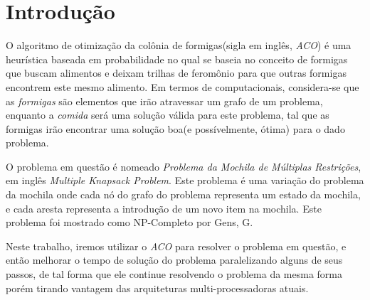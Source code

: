 \section{Introdução}
	O algoritmo de otimização da colônia de formigas(sigla em inglês, {\it ACO}) é uma heurística baseada em probabilidade no qual se baseia no conceito de formigas que buscam alimentos e deixam trilhas de feromônio para que outras formigas encontrem este mesmo alimento\cite{antsystem}. Em termos de computacionais, considera-se que as \textit{formigas} são elementos que irão atravessar um grafo de um problema, enquanto a \textit{comida} será uma solução válida para este problema, tal que as formigas irão encontrar uma solução boa(e possívelmente, ótima) para o dado problema.
	
	O problema em questão é nomeado \textit{Problema da Mochila de Múltiplas Restrições}, em inglês \textit{Multiple Knapsack Problem}. Este problema é uma variação do problema da mochila onde cada nó do grafo do problema representa um estado da mochila, e cada aresta representa a introdução de um novo item na mochila. Este problema foi mostrado como NP-Completo por Gens, G\cite{complexity}.
	
	Neste trabalho, iremos utilizar o \textit{ACO} para resolver o problema em questão, e então melhorar o tempo de solução do problema paralelizando alguns de seus passos, de tal forma que ele continue resolvendo o problema da mesma forma porém tirando vantagem das arquiteturas multi-processadoras atuais.
